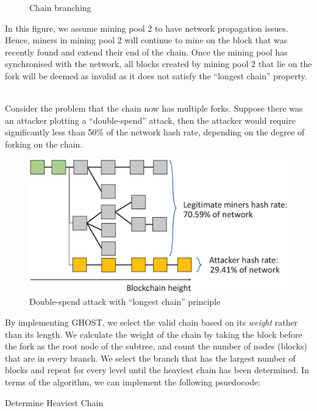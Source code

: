 \documentclass[a4paper,12pt]{article}
\begin{document}
{{\begin{minipage}{.45\textwidth}
\begin{figure}[H]
	\caption{Chain branching}
	\label{fig:ghost}
\end{figure}
\end{minipage}
\hfill
\vline
\hfill
\begin{minipage}{.52\textwidth}
	In this figure, we assume mining pool 2 to have network propagation issues. Hence, miners in mining pool 2 will continue to mine on the block that was recently found and extend their end of the chain. Once the mining pool has synchronised with the network, all blocks created by mining pool 2 that lie on the fork will be deemed as invalid as it does not satisfy the ``longest chain'' property.
\end{minipage}\\\vspace{1em}\newline
Consider the problem that the chain now has multiple forks. Suppose there was an attacker plotting a ``double-spend'' attack, then the attacker would require significantly less than 50\% of the network hash rate, depending on the degree of forking on the chain.
\begin{figure}[H]
	\centering
	\includegraphics[width=0.7\linewidth]{ghost2spend}
	\caption{Double-spend attack with ``longest chain'' principle}
	\label{fig:ghost2spend}
\end{figure}
\noindent By implementing \ac{GHOST}, we select the valid chain based on its \textit{weight} rather than its length. We calculate the weight of the chain by taking the block before the fork as the root node of the subtree, and count the number of nodes (blocks) that are in every branch. We select the branch that has the largest number of blocks and repeat for every level until the heaviest chain has been determined. In terms of the algorithm, we can implement the following psuedocode:
\begin{algorithm}
	\caption{Determine Heaviest Chain}\label{heavychain}
	\begin{algorithmic}[1]

\end{algorithmic}
\end{algorithm}}}
\end{document}

